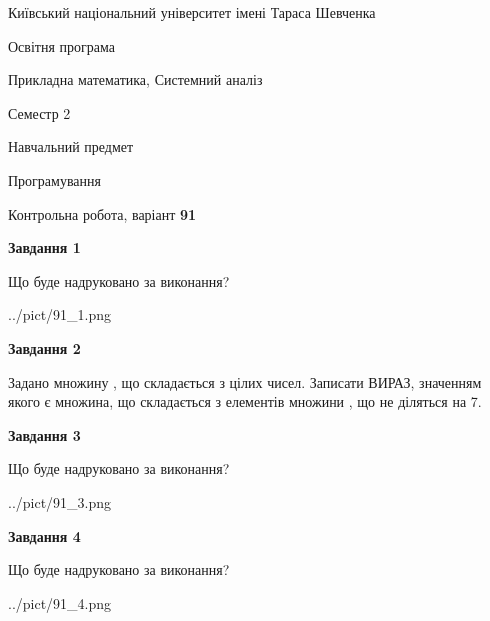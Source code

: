 \documentclass[12pt, ukrainian]{article}
\begin{document}
{{\begin {small}\par
{ \center  Київський національний університет імені Тараса Шевченка \par}
{\parbox {5 cm}{Освітня програма \hfill}{\parbox {8 cm}{Прикладна математика, Системний аналіз \hfill}}\parbox {5 cm}{\hfill Семестр 2}}\par
{\parbox {5 cm} {Навчальний предмет \hfill}\parbox {7 cm}{Програмування \hfill}\parbox {6cm}{\hfill}\par}\vspace{-7pt} \end{small}}{\center Контрольна робота, варіант  \No \textbf
{ 91 }\par}}
{
\begin {large}
{\begin {center}\textbf{Завдання 1}\end {center}}\par
Що буде надруковано за виконання?\par\par
\begin{center}
	{../pict/91_1.png}
\end{center}
\newpage

{\begin {center}\textbf{Завдання 2}\end {center}}\par
Задано множину , що складається з цілих чисел. Записати ВИРАЗ, значенням якого є множина, що складається  з елементів множини , що не діляться на 7.\par
\newpage

{\begin {center}\textbf{Завдання 3}\end {center}}\par
Що буде надруковано за виконання?\par
\begin{center}
	{../pict/91_3.png}
\end{center}
\newpage

{\begin {center}\textbf{Завдання 4}\end {center}}\par
Що буде надруковано за виконання?\par
\begin{center}
	{../pict/91_4.png}
\end{center}
\newpage


\end{large}}
\end{document}
